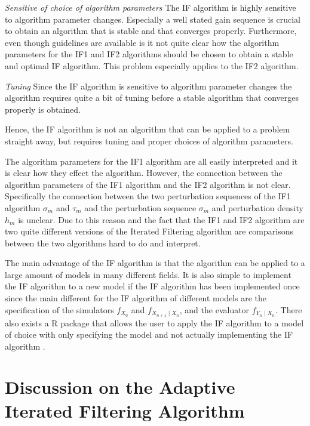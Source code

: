 \documentclass[twoside,openright]{report}
\begin{document}
\setcounter{para}{0} %

\mypara \textit{Sensitive of choice of algorithm parameters} The IF algorithm is highly sensitive to algorithm parameter changes. Especially a well stated gain sequence is crucial to obtain an algorithm that is stable and that converges properly. Furthermore, even though guidelines are available is it not quite clear how the algorithm parameters for the IF1 and IF2 algorithms should be chosen to obtain a stable and optimal IF algorithm. This problem especially applies to the IF2 algorithm. 

\mypara \textit{Tuning} Since the IF algorithm is sensitive to algorithm parameter changes the algorithm requires quite a bit of tuning before a stable algorithm that converges properly is obtained. 

Hence, the IF algorithm is not an algorithm that can be applied to a problem straight away, but requires tuning and proper choices of algorithm parameters. 

The algorithm parameters for the IF1 algorithm are all easily interpreted and it is clear how they effect the algorithm. However, the connection between the algorithm parameters of the IF1 algorithm and the IF2 algorithm is not clear. Specifically the connection between the two perturbation sequences of the IF1 algorithm $\sigma_m$ and $\tau_m$ and the perturbation sequence $\sigma_m$ and perturbation density $h_m$ is unclear. Due to this reason and the fact that the IF1 and IF2 algorithm are two quite different versions of the Iterated Filtering algorithm are comparisons between the two algorithms hard to do and interpret. 

The main advantage of the IF algorithm is that the algorithm can be applied to a large amount of models in many different fields. It is also simple to implement the IF algorithm to a new model if the IF algorithm has been implemented once since the main different for the IF algorithm of different models are the specification of the simulators $f_{X_0}$ and $f_{X_{n+1} \mid X_n}$, and the evaluator $f_{Y_n \mid X_n}$. There also exists a R package that allows the user to apply the IF algorithm to a model of choice  with only specifying the model and not actually implementing the IF algorithm \cite{king2015statistical}. 

\section{Discussion on the Adaptive Iterated Filtering Algorithm}
\end{document}
